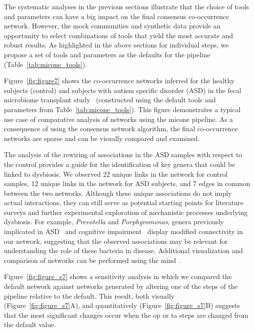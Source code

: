   The systematic analyses in the previous sections illustrate that the choice of tools and parameters can have a big impact on the final consensus co-occurrence network.
  However, the mock communities and synthetic data provide an opportunity to select combinations of tools that yield the most accurate and robust results.
  As highlighted in the above sections for individual steps, we propose a set of tools and parameters as the defaults for the pipeline (Table~\ref{tab:micone_tools}).

  Figure~\ref{fig:figure7} shows the co-occurrence networks inferred for the healthy subjects (control) and subjects with autism specific disorder (ASD) in the fecal microbiome transplant study~\cite{Kang2017} (constructed using the default tools and parameters from Table~\ref{tab:micone_tools}).
  This figure demonstrates a typical use case of comparative analysis of networks using the \ac{micone} pipeline.
  As a consequence of using the consensus network algorithm, the final co-occurrence networks are sparse and can be visually compared and examined.

  The analysis of the rewiring of associations in the ASD samples with respect to the control provides a guide for the identification of key genera that could be linked to dysbiosis.
  We observed 22 unique links in the network for control samples, 12 unique links in the network for ASD subjects, and 7 edges in common between the two networks.
  Although these unique associations do not imply actual interactions, they can still serve as potential starting points for literature surveys and further experimental exploration of mechanistic processes underlying dysbiosis.
  For example, \textit{Prevotella} and \textit{Porphyromonas}, genera previously implicated in ASD~\cite{Kang2017,hoGutMicrobiotaChanges2020} and cognitive impairment~\cite{chiPorphyromonasGingivalisInducedCognitive2021} display modified connectivity in our network, suggesting that the observed associations may be relevant for understanding the role of these bacteria in disease.
  Additional visualization and comparison of networks can be performed using the \acl{mind}~\cite{huResourceComparisonIntegration2022}.

  Figure~\ref{fig:figure_s7} shows a sensitivity analysis in which we compared the default network against networks generated by altering one of the steps of the pipeline relative to the default.
  This result, both visually (Figure~\ref{fig:figure_s7}A), and quantitatively (Figure~\ref{fig:figure_s7}B)  suggests that the most significant changes occur when the \ac{op} or \ac{ta} steps are changed from the default value.

